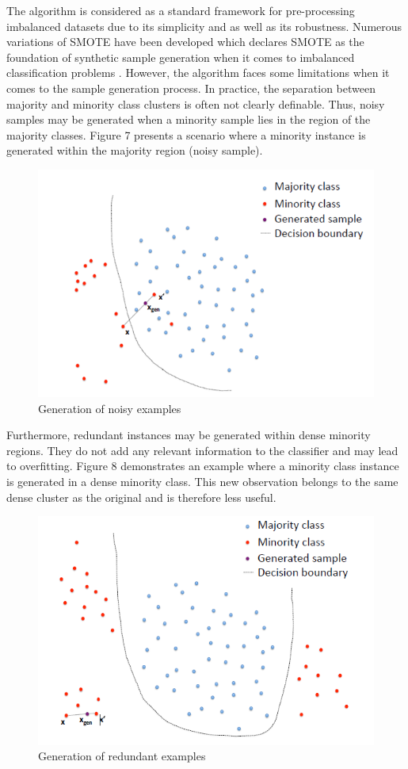\documentclass[parskip=full]{scrartcl}
\begin{document}
The algorithm is considered as a standard framework for pre-processing
imbalanced datasets due to its simplicity and as well as its robustness.
Numerous variations of SMOTE have been developed which declares SMOTE as the
foundation of synthetic sample generation when it comes to imbalanced
classification problems \cite{Fernandez.2018}. However, the algorithm faces some
limitations when it comes to the sample generation process. In practice, the
separation between majority and minority class clusters is often not clearly
definable. Thus, noisy samples may be generated when a minority sample lies in
the region of the majority classes. Figure 7 presents a scenario where a
minority instance is generated within the majority region (noisy sample).

\begin{figure}[H]
	\centering
	\includegraphics[width=0.6\linewidth]{./resources/noisy_examples}
	\caption{Generation of noisy examples}
	\label{fig:noisy-examples}
\end{figure}

Furthermore, redundant instances may be generated within dense minority regions.
They do not add any relevant information to the classifier and may lead to
overfitting. Figure 8 demonstrates an example where a minority class instance is
generated in a dense minority class. This new observation belongs to the same
dense cluster as the original and is therefore less useful. 

\begin{figure}[H]
	\centering
	\includegraphics[width=0.6\linewidth]{./resources/redundant_examples}
	\caption{Generation of redundant examples}
	\label{fig:redundant-examples}
\end{figure}
\end{document}
